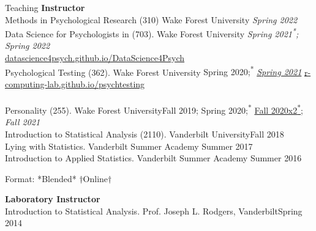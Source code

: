 \begin{rSection}{\textrm{Teaching}}
\vspace*{2pt}
{\large  \bf Instructor}\\
Methods in Psychological Research (310) Wake Forest University \hfill {\textit{Spring 2022}}\smallskip\\
Data Science for Psychologists in \R (703). Wake Forest University   \hfill{\textit{Spring 2021\textsuperscript{*}; Spring 2022}}\\
\hspace* {6 mm}\href{https://datascience4psych.github.io/DataScience4Psych/}{\color{blue} datascience4psych.github.io/DataScience4Psych}\smallskip\\
Psychological Testing  (362). Wake Forest University \hfill{Spring 2020;\textsuperscript{*} \href{https://www.youtube.com/playlist?list=PLKrrdtYgOUYYgag4erySD7L0jDcZGMlS_}{\color{blue}\textit{Spring 2021\noteBns}}}
\hspace* {6 mm} \href{https://r-computing-lab.github.io/psychtesting/}{\color{blue} r-computing-lab.github.io/psychtesting}\smallskip\\
\smallskip\\
Personality (255). Wake Forest University\hfill{Fall 2019; Spring 2020;\textsuperscript{*} \href{https://www.youtube.com/playlist?list=PLKrrdtYgOUYZpENpYddjG8n_q3bfbx8Kr}{\color{blue}Fall 2020x2\textsuperscript{*}\noteBns}; \textit{Fall 2021}}\smallskip\\
Introduction to Statistical Analysis (2110). Vanderbilt University\hfill {Fall 2018}\smallskip\\
Lying with Statistics. Vanderbilt Summer Academy \hfill{Summer 2017}\smallskip\\
Introduction to Applied Statistics. Vanderbilt Summer Academy \hfill{Summer 2016}%
\vspace{-2mm}\begin{center}\footnotesize{Format: *Blended* $\dagger$Online$\dagger$}\end{center}%
\begin{minipage}{\linewidth}
{\large {\bf Laboratory Instructor}}\\
Introduction to Statistical Analysis. Prof. Joseph L. Rodgers, Vanderbilt\hfill{Spring 2014}%

\end{minipage}
\end{rSection}
